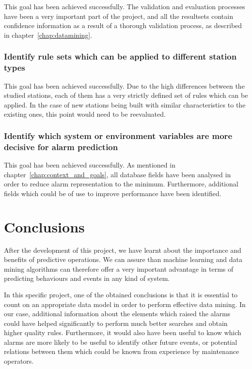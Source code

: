 This goal has been achieved successfully. The validation and evaluation processes have been a very important part of the project, and all the resultsets contain confidence information as a result of a thorough validation process, as described in chapter~\ref{chap:datamining}.

\subsubsection*{Identify rule sets which can be applied to different station types}

This goal has been achieved successfully. Due to the high differences between the studied stations, each of them has a very strictly defined set of rules which can be applied. In the case of new stations being built with similar characteristics to the existing ones, this point would need to be reevaluated.

\subsubsection*{Identify which system or environment variables are more decisive for alarm prediction}

This goal has been achieved successfully. As mentioned in chapter~\ref{chap:context_and_goals}, all database fields have been analysed in order to reduce alarm representation to the minimum. Furthermore, additional fields which could be of use to improve performance have been identified.

\section{Conclusions}
After the development of this project, we have learnt about the importance and benefits of predictive operations. We can assure than machine learning and data mining algorithms can therefore offer a very important advantage in terms of predicting behaviours and events in any kind of system.

In this specific project, one of the obtained conclusions is that it is essential to count on an appropriate data model in order to perform effective data mining. In our case, additional information about the elements which raised the alarms could have helped significantly to perform much better searches and obtain higher quality rules. Furthermore, it would also have been useful to know which alarms are more likely to be useful to identify other future events, or potential relations between them which could be known from experience by maintenance operators.

